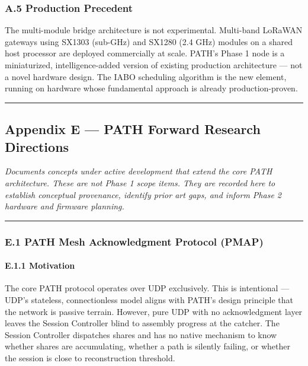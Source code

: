 \documentclass[
  11pt,
]{article}
\begin{document}
\hypertarget{a.5-production-precedent}{%
\subsubsection{A.5 Production
Precedent}\label{a.5-production-precedent}}

The multi-module bridge architecture is not experimental. Multi-band
LoRaWAN gateways using SX1303 (sub-GHz) and SX1280 (2.4 GHz) modules on
a shared host processor are deployed commercially at scale. PATH's Phase
1 node is a miniaturized, intelligence-added version of existing
production architecture --- not a novel hardware design. The IABO
scheduling algorithm is the new element, running on hardware whose
fundamental approach is already production-proven.

\begin{center}\rule{0.5\linewidth}{0.5pt}\end{center}

\hypertarget{appendix-e-path-forward-research-directions}{%
\subsection{Appendix E --- PATH Forward Research
Directions}\label{appendix-e-path-forward-research-directions}}

\emph{Documents concepts under active development that extend the core
PATH architecture. These are not Phase 1 scope items. They are recorded
here to establish conceptual provenance, identify prior art gaps, and
inform Phase 2 hardware and firmware planning.}

\begin{center}\rule{0.5\linewidth}{0.5pt}\end{center}

\hypertarget{e.1-path-mesh-acknowledgment-protocol-pmap}{%
\subsubsection{E.1 PATH Mesh Acknowledgment Protocol
(PMAP)}\label{e.1-path-mesh-acknowledgment-protocol-pmap}}

\hypertarget{e.1.1-motivation}{%
\paragraph{E.1.1 Motivation}\label{e.1.1-motivation}}

The core PATH protocol operates over UDP exclusively. This is
intentional --- UDP's stateless, connectionless model aligns with PATH's
design principle that the network is passive terrain. However, pure UDP
with no acknowledgment layer leaves the Session Controller blind to
assembly progress at the catcher. The Session Controller dispatches
shares and has no native mechanism to know whether shares are
accumulating, whether a path is silently failing, or whether the session
is close to reconstruction threshold.
\end{document}
